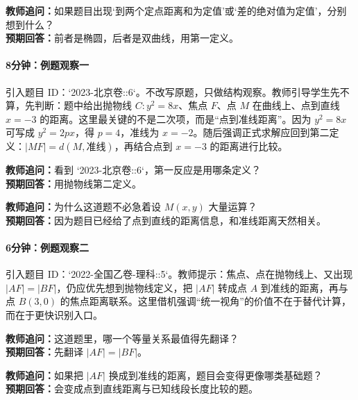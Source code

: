 \documentclass[UTF8,a4paper,11pt]{ctexart}
\begin{document}
\noindent\textbf{教师追问：}如果题目出现‘到两个定点距离和为定值’或‘差的绝对值为定值’，分别想到什么？\\

\textbf{预期回答：}前者是椭圆，后者是双曲线，用第一定义。\par

\paragraph{8分钟：例题观察一}

引入题目 ID：`2023-北京卷::6`。不改写原题，只做结构观察。教师引导学生先不算，先判断：题中给出抛物线 $C:y^2=8x$、焦点 $F$、点 $M$ 在曲线上、点到直线 $x=-3$ 的距离。这里最关键的不是二次项，而是“点到准线距离”。因为 $y^2=8x$ 可写成 $y^2=2px$，得 $p=4$，准线为 $x=-2$。随后强调正式求解应回到第二定义：$|MF|=d(M,\text{准线})$，再结合点到 $x=-3$ 的距离进行比较。

\noindent\textbf{教师追问：}看到 `2023-北京卷::6`，第一反应是用哪条定义？\\

\textbf{预期回答：}用抛物线第二定义。\par

\noindent\textbf{教师追问：}为什么这道题不必急着设 $M(x,y)$ 大量运算？\\

\textbf{预期回答：}因为题目已经给了点到直线的距离信息，和准线距离天然相关。\par

\paragraph{6分钟：例题观察二}

引入题目 ID：`2022-全国乙卷-理科::5`。教师提示：焦点、点在抛物线上、又出现 $|AF|=|BF|$，仍应优先想到抛物线定义，把 $|AF|$ 转成点 $A$ 到准线的距离，再与点 $B(3,0)$ 的焦点距离联系。这里借机强调“统一视角”的价值不在于替代计算，而在于更快识别入口。

\noindent\textbf{教师追问：}这道题里，哪一个等量关系最值得先翻译？\\

\textbf{预期回答：}先翻译 $|AF|=|BF|$。\par

\noindent\textbf{教师追问：}如果把 $|AF|$ 换成到准线的距离，题目会变得更像哪类基础题？\\

\textbf{预期回答：}会变成点到直线距离与已知线段长度比较的题。\par
\end{document}
